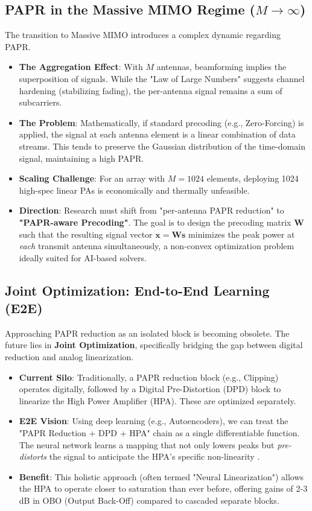 \documentclass[conference]{IEEEtran}
\begin{document}
\subsection{PAPR in the Massive MIMO Regime ($M \to \infty$)}
The transition to Massive MIMO introduces a complex dynamic regarding PAPR.

\begin{itemize}
    \item \textbf{The Aggregation Effect}: With $M$ antennas, beamforming implies the superposition of signals. While the "Law of Large Numbers" suggests channel hardening (stabilizing fading), the per-antenna signal remains a sum of subcarriers.
    \item \textbf{The Problem}: Mathematically, if standard precoding (e.g., Zero-Forcing) is applied, the signal at each antenna element is a linear combination of data streams. This tends to preserve the Gaussian distribution of the time-domain signal, maintaining a high PAPR.
    \item \textbf{Scaling Challenge}: For an array with $M=1024$ elements, deploying 1024 high-spec linear PAs is economically and thermally unfeasible.
    \item \textbf{Direction}: Research must shift from "per-antenna PAPR reduction" to \textbf{"PAPR-aware Precoding"}. The goal is to design the precoding matrix $\mathbf{W}$ such that the resulting signal vector $\mathbf{x} = \mathbf{W}\mathbf{s}$ minimizes the peak power at \textit{each} transmit antenna simultaneously, a non-convex optimization problem ideally suited for AI-based solvers.
\end{itemize}

\subsection{Joint Optimization: End-to-End Learning (E2E)}
Approaching PAPR reduction as an isolated block is becoming obsolete. The future lies in \textbf{Joint Optimization}, specifically bridging the gap between digital reduction and analog linearization.

\begin{itemize}
    \item \textbf{Current Silo}: Traditionally, a PAPR reduction block (e.g., Clipping) operates digitally, followed by a Digital Pre-Distortion (DPD) block to linearize the High Power Amplifier (HPA). These are optimized separately.
    \item \textbf{E2E Vision}: Using deep learning (e.g., Autoencoders), we can treat the "PAPR Reduction + DPD + HPA" chain as a single differentiable function. The neural network learns a mapping that not only lowers peaks but \textit{pre-distorts} the signal to anticipate the HPA's specific non-linearity \cite{ref13}.
    \item \textbf{Benefit}: This holistic approach (often termed "Neural Linearization") allows the HPA to operate closer to saturation than ever before, offering gains of 2-3 dB in OBO (Output Back-Off) compared to cascaded separate blocks.
\end{itemize}
\end{document}
